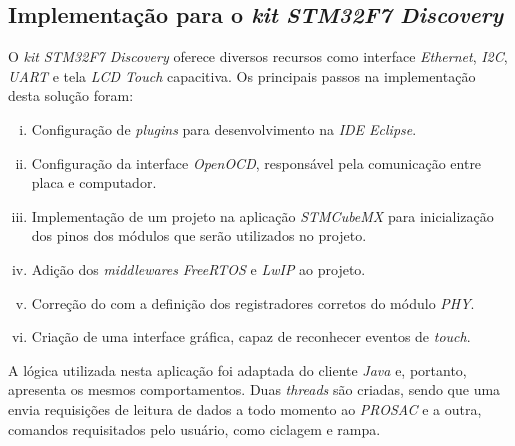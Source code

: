 \subsection {Implementação para o \textit{kit} \textit{STM32F7 Discovery}}

O \textit{kit} \textit{STM32F7 Discovery} oferece diversos recursos
como interface \textit{Ethernet}, \textit{I2C}, \textit{UART} e tela
\textit{LCD Touch} capacitiva. Os principais passos na implementação desta
solução foram:

\begin{enumerate} [i.]
  \item Configuração de \textit{plugins} para desenvolvimento na \textit{IDE
  Eclipse}.
  \item Configuração da interface \textit{OpenOCD}, responsável pela comunicação
  entre placa e computador.
  \item Implementação de um projeto na aplicação \textit{STMCubeMX} para
  inicialização dos pinos dos módulos que serão utilizados no projeto.
  \item Adição dos \textit{middlewares} \textit{FreeRTOS} e \textit{LwIP} ao
  projeto.
  \item Correção do  com a definição dos
  registradores corretos do módulo \textit{PHY}.
  \item Criação de uma interface gráfica, capaz de reconhecer
  eventos de \textit{touch}.
\end{enumerate}

A lógica utilizada nesta aplicação foi adaptada do cliente \textit{Java} e,
portanto, apresenta os mesmos comportamentos. Duas \textit{threads} são criadas,
sendo que uma envia requisições de leitura de dados a todo momento ao
\textit{PROSAC} e a outra, comandos requisitados pelo usuário, como ciclagem e
rampa.
